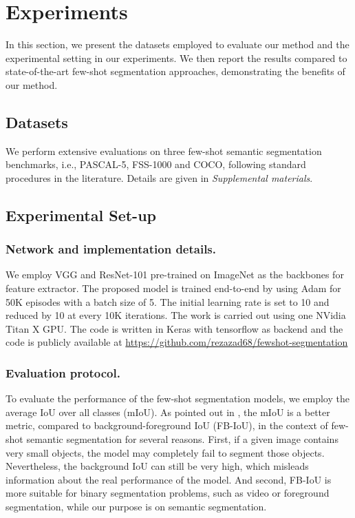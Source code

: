 \documentclass[runningheads]{llncs}
\begin{document}
 
\section{Experiments}
In this section, we present the datasets employed to evaluate our method and the experimental setting in our experiments. We then report the results compared to state-of-the-art few-shot segmentation approaches, demonstrating the benefits of our method.


\subsection{Datasets}

We perform extensive evaluations on three few-shot semantic segmentation benchmarks, i.e., PASCAL-5, FSS-1000 and COCO, following standard procedures in the literature. Details are given in \textit{Supplemental materials}.



\subsection{Experimental Set-up}

\subsubsection{Network and implementation details.} 
We employ VGG \cite{simonyan2014very} and ResNet-101 pre-trained on ImageNet as the backbones for feature extractor. The proposed model is trained end-to-end by using Adam \cite{kingma2014adam} for 50K episodes with a batch size of 5. The initial learning rate is set to 10 and reduced by 10 at every 10K iterations.  The work is carried out using one NVidia Titan X GPU. The code is written in Keras with tensorflow as backend and the code is publicly available at \url{https://github.com/rezazad68/fewshot-segmentation}





\subsubsection{Evaluation protocol.} 

To evaluate the performance of the few-shot segmentation models, we employ the average IoU over all classes (mIoU). As pointed out in \cite{zhang2019canet}, the mIoU is a better metric, compared to background-foreground IoU (FB-IoU), in the context of few-shot semantic segmentation for several reasons. First, if a given image contains very small objects, the model may completely fail to segment those objects. Nevertheless, the background IoU can still be very high, which misleads information about the real performance of the model. And second, FB-IoU is more suitable for binary segmentation problems, such as video or foreground segmentation, while our purpose is on semantic segmentation.
\end{document}
